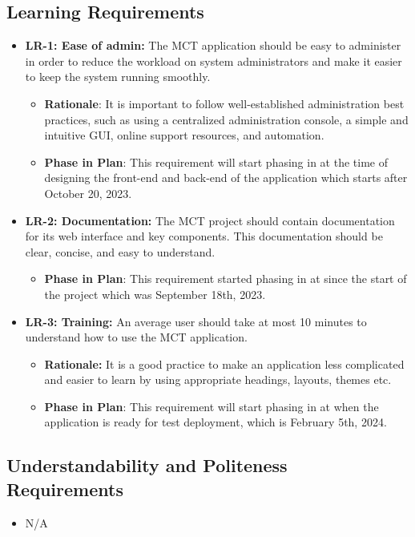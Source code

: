 \documentclass[12pt]{article}
\begin{document}
\subsection{Learning Requirements}
\begin{itemize}
    \item 
\textbf{LR-1: Ease of admin:} The MCT application should be easy to administer in order to reduce the workload on system administrators and make it easier to keep the system running smoothly.
\begin{itemize}
    \item \textbf{Rationale}: It is important to follow well-established administration best practices, such as using a centralized administration console, a simple and intuitive GUI, online support resources, and automation.
    \item \textbf{Phase in Plan}: This requirement will start phasing in at the time of designing the front-end and back-end of the application which starts after October 20, 2023.
\end{itemize}
\item 
\textbf{LR-2: Documentation: }The MCT project should contain documentation for its web interface and key components. This documentation should be clear, concise, and easy to understand.
\begin{itemize}
    \item \textbf{Phase in Plan}: This requirement started phasing in at since the start of the project which was September 18th, 2023.
\end{itemize}
\item 
\textbf{LR-3: Training: }An average user should take at most 10 minutes to understand how to use the MCT application.
\begin{itemize}
    \item \textbf{Rationale: }It is a good practice to make an application less complicated and easier to learn by using appropriate headings, layouts, themes etc.
    \item \textbf{Phase in Plan}: This requirement will start phasing in at when the application is ready for test deployment, which is February 5th, 2024.
\end{itemize}






\end{itemize}
\subsection{Understandability and Politeness Requirements}
\begin{itemize}
    \item N/A
\end{itemize}
\end{document}
